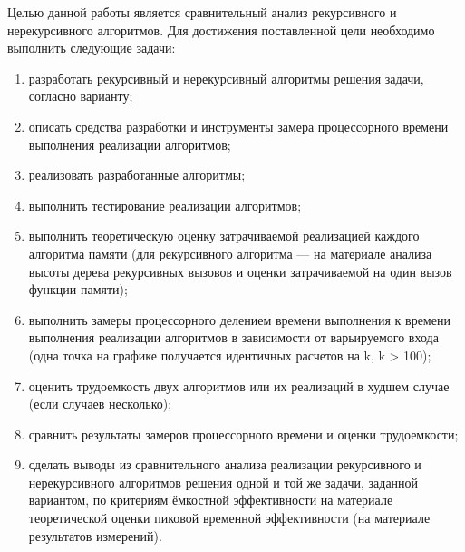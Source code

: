 
Целью данной работы является сравнительный анализ рекурсивного и нерекурсивного алгоритмов. Для достижения поставленной цели необходимо выполнить следующие задачи:

\begin{enumerate}
	\item разработать рекурсивный и нерекурсивный алгоритмы решения задачи, согласно варианту;
	\item описать средства разработки и инструменты замера процессорного времени выполнения реализации алгоритмов;
	\item реализовать разработанные алгоритмы;
	\item выполнить тестирование реализации алгоритмов;
	\item выполнить теоретическую оценку затрачиваемой реализацией каждого алгоритма памяти (для рекурсивного алгоритма --- на материале анализа высоты дерева рекурсивных вызовов и оценки затрачиваемой на один вызов функции памяти);
	\item выполнить замеры процессорного делением времени выполнения к времени выполнения реализации алгоритмов в зависимости от варьируемого входа (одна точка на графике получается идентичных расчетов на k, k > 100);
	\item оценить трудоемкость двух алгоритмов или их реализаций в худшем случае (если случаев несколько);
	\item сравнить результаты замеров процессорного времени и оценки трудоемкости;
	\item сделать выводы из сравнительного анализа реализации рекурсивного и нерекурсивного алгоритмов решения одной и той же задачи, заданной вариантом, по критериям ёмкостной эффективности на материале теоретической оценки пиковой временной эффективности (на материале результатов измерений).

\end{enumerate}
\newpage

\clearpage

